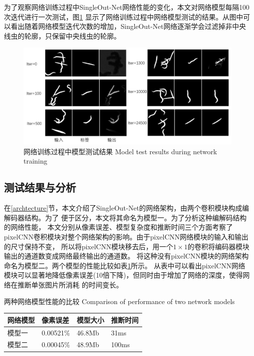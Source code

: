 	
	为了观察网络训练过程中SingleOut-Net网络性能的变化，本文对网络模型每隔100次迭代进行一次测试，图\ref{fig:chap4:progress}
	显示了网络训练过程中网络模型测试的结果。从图中可以看出随着网络模型迭代次数的增加，SingleOut-Net网络逐渐学会过滤掉非中央
	线虫的轮廓，只保留中央线虫的轮廓。
		\begin{figure}[htb]
	  \centering
	  \includegraphics[width=15cm]{figure/chap4/progress.jpg}
	  \bicaption
		{网络训练过程中模型测试结果}
		{Model test results during network training}
	  \label{fig:chap4:progress}
	\end{figure}
\subsection{测试结果与分析}
	 在\ref{archtecture}节，本文介绍了SingleOut-Net的网络架构，由两个卷积模块构成编解码器结构。为了
	 便于区分，本文将其命名为模型一。为了分析这种编解码结构的网络性能，
	 本文分别从像素误差、模型复杂度和推断时间三个方面考察了
	 pixelCNN卷积模块对整个网络架构的影响。由于pixelCNN网络模块的输入和输出的尺寸保持不变，
	 所以将pixelCNN模块移去后，用一个$1\times1$的卷积将编码器模块输出的通道数变成网络最终输出的通道数。
	 将这种没有pixelCNN模块的网络架构命名为模型二。两个模型的性能比较如表\ref{tab:performance}所示。
	 从表中可以看出pixelCNN网络模块可以显著地降低像素误差(10倍下降)，但同时由于增加了网络的深度，使得网络在推断单张图片所消耗
	 的时间变长。
\begin{table}[!hpb]
	\centering
	\bicaption
    {两种网络模型性能的比较}
    {Comparison of performance of two network models}
	\label{tab:performance}
	\begin{tabular}{p{75pt}p{75pt}p{75pt}p{75pt}}
	\toprule
	网络模型 & 像素误差 & 模型大小 & 推断时间 \\
	\midrule
	模型一 &  0.00521\% & 46.8Mb & 31ms \\
	模型二 & 0.00045\% & 48.9Mb & 100ms \\
	\bottomrule
\end{tabular}
\end{table}
